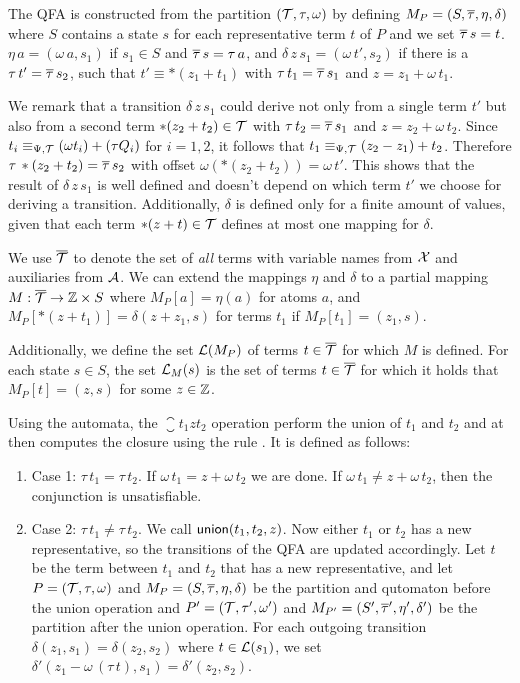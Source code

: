 The QFA is constructed from the partition  $(\mathcal{T}, \tau, \omega)$ by defining $M_P = (S, \overline{\tau}, \eta, \delta)$ where $S$ contains a state $s$ for each representative term $t$ of $P$ and we set $\overline{\tau}\,s = t$.
$\eta\,a = (\omega\,a, s_1)$ if $s_1 \in S$ and $\overline{\tau}\,s = \tau\,a$,
and $\delta\,z\,s_1 = (\omega\,t', s_2)$ if there is a $\tau\,t'=\overline{\tau}\,s_2$, such that $t' \equiv *(z_1 + t_1)$ with $\tau \,t_1= \overline{\tau}\,s_1$ and $z = z_1 + \omega\,t_1$.

We remark that a transition $\delta\,z\,s_1$ could derive not only from a single term $t'$ but also from a second term $*(z_2 + t_2) \in \mathcal{T}$ with $\tau\,t_2=\overline{\tau}\,s_1$ and $z = z_2 + \omega\,t_2$.
Since $t_i \equiv_{\Psi,\mathcal{T}} (\omega t_i) + (\tau Q_i)$ for $i = 1,2$, it follows that $t_1 \equiv_{\Psi,\mathcal{T}} (z_2 - z_1)+ t_2$.
Therefore $\tau\,*(z_2+t_2)=\overline{\tau}\,s_2$ with offset $\omega(*(z_2+t_2)) = \omega\,t'$.
This shows that the result of $\delta\,z\,s_1$ is well defined and doesn't depend on which term $t'$ we choose for deriving a transition.
Additionally, $\delta$ is defined only for a finite amount of values, given that each term $*(z + t) \in \mathcal{T}$ defines at most one mapping for $\delta$.

We use ${\overline{\mathcal{T}}}$ to denote the set of \emph{all} terms with variable names from $\mathcal{X}$ and auxiliaries from $\mathcal{A}$.
We can extend the mappings $\eta$ and $\delta$ to a partial mapping $M : {\overline{\mathcal{T}}} \rightarrow \mathbb{Z} \times S$ where $M_P[a] = \eta(a)$ for atoms $a$, and $M_P[*(z+t_1)] = \delta(z+z_1, s)$ for terms $t_1$ if $M_P[t_1] = (z_1,s)$.

Additionally, we define the set $\mathcal{L}(M_P)$ of terms $t \in {\overline{\mathcal{T}}}$ for which $M$ is defined.
For each state $s \in S$, the set $\mathcal{L}_M(s)$ is the set of terms $t \in {\overline{\mathcal{T}}}$ for which it holds that $M_P[t] = (z, s)$ for some $z \in \mathbb{Z}$.

Using the automata, the $\closure{t_1}{z}{t_2}$ operation perform the union of $t_1$ and $t_2$ and at
then computes the closure using the rule .
It is defined as follows:

\begin{enumerate}
  \item Case 1: $\tau\,t_1 = \tau\,t_2$. If $\omega\,t_1 = z + \omega\,t_2$ we are done.
  If $\omega\,t_1 \neq z + \omega\,t_2$, then the conjunction is unsatisfiable.
  \item Case 2: $\tau\,t_1 \neq \tau\,t_2$. We call $\textsf{union}(t_1, t_2, z)$.
  Now either $t_1$ or $t_2$ has a new representative, so the transitions of the QFA are updated accordingly.
  Let $t$ be the term between $t_1$ and $t_2$ that has a new representative,
  and let $P = (\mathcal{T}, \tau, \omega)$ and $M_P = (S, \overline{\tau}, \eta, \delta)$ be the partition and qutomaton before the union operation
  and $P' = (\mathcal{T}, \tau', \omega')$ and $M_{P'} = (S', \overline{\tau}', \eta', \delta')$ be the partition after the union operation.
  For each outgoing transition $\delta(z_1, s_1) = \delta(z_2, s_2)$ where $t \in \mathcal{L}(s_1)$,
  we set $\delta'(z_1 - \omega\,(\tau\,t), s_1) = \delta'(z_2, s_2)$.
\end{enumerate}

